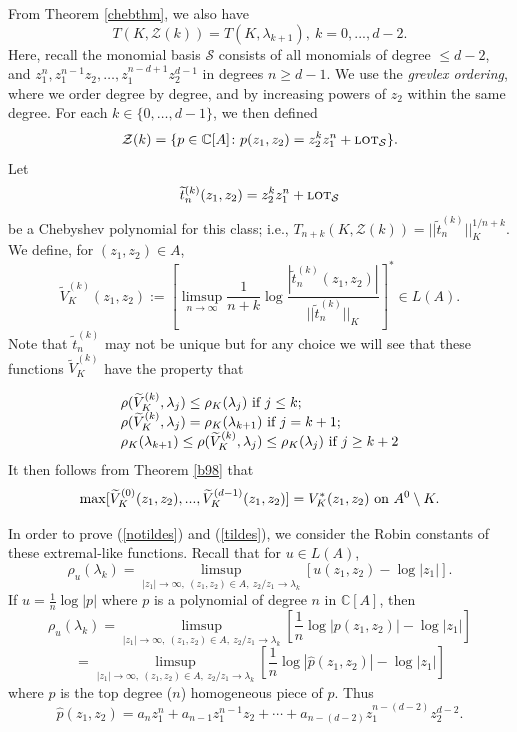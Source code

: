 \documentclass[12pt]{article}
\numberwithin{equation}{section}
\newcommand{\C}{\mathbb{C}}
\renewcommand{\hat}{\widehat}
\renewcommand{\tilde}{\widetilde}
\newcommand{\lot}{\text{\sc lot}}
\newcommand{\calZ}{\mathcal{Z}}
\newcommand{\calS}{\mathcal{S}}
\begin{document}
From Theorem \ref{chebthm}, we also have 
\begin{equation}\label{keyeq} T(K,\calZ(k))=T(K,\lambda_{k+1}), \ k=0,...,d-2. \end{equation} 
Here, recall the monomial basis $\calS$ consists of all monomials of degree $\leq d-2$, and $z_1^{n},  z_1^{n-1}z_2,\ldots,z_1^{n-d+1}z_2^{d-1}$ in degrees $n\geq d-1$.  We use the \emph{grevlex ordering}, where we order degree by degree,  and by increasing powers of $z_2$ within the same degree. For each $k\in\{0,\ldots,d-1\}$, we then defined 
$$\calZ(k) = \{ p\in\C[A]\colon p(z_1,z_2)=z_2^kz_1^n+\lot_{\calS} \}.$$
Let 
$$\tilde t_{n}^{(k)}(z_1,z_2)=z_2^kz_1^n+\lot_{\calS}$$
be a Chebyshev polynomial for this class; i.e., $T_{n+k}(K,\calZ(k))= ||\tilde t_{n}^{(k)}||_K^{1/n+k}$. We define, for $(z_1,z_2)\in A$,   
\begin{equation}\label{vkkt} \tilde V_{K}^{(k)}(z_1,z_2):=[\limsup_{n\to \infty} \frac{1}{n+k}\log \frac{| \tilde t_{n}^{(k)}(z_1,z_2)|}{||\tilde t_{n}^{(k)}||_K}]^* \in L(A).\end{equation}
Note that $\tilde t_{n}^{(k)}$ may not be unique 
but for any choice we will see that these functions $\tilde V_{K}^{(k)}$ have the property that 

\begin{eqnarray}\label{tildes}
\begin{array}{l} \rho(\tilde V_{K}^{(k)},\lambda_j) \leq \rho_K(\lambda_{j}) \ \hbox{if } j \leq k;\\
 \rho(\tilde V_{K}^{(k)},\lambda_j)=  \rho_K(\lambda_{k+1}) \ \hbox{if } j= k+1; \\
 \rho_K(\lambda_{k+1})  \leq   \rho(\tilde V_{K}^{(k)},\lambda_j) \leq \rho_K(\lambda_{j}) \ \hbox{if } j \geq k+2
     \end{array} 
\end{eqnarray}
It then follows from Theorem \ref{b98} that 
$$\max [\tilde V_{K}^{(0)}(z_1,z_2),...,\tilde V_{K}^{(d-1)}(z_1,z_2)]= V_K^*(z_1,z_2)  \ \hbox{on} \ A^0 \setminus K.$$

In order to prove (\ref{notildes}) and (\ref{tildes}), we consider the Robin constants of these extremal-like functions. Recall that for $u\in L(A)$, 
$$\rho_u(\lambda_k)=\limsup_{|z_1|\to \infty, \ (z_1,z_2)\in A, \ z_2/z_1\to \lambda_k} [u(z_1,z_2)-\log |z_1|].$$
If $u=\frac{1}{n}\log |p|$ where $p$ is a polynomial of degree $n$ in $\C[A]$, then
$$\rho_u(\lambda_k)=\limsup_{|z_1|\to \infty, \ (z_1,z_2)\in A, \ z_2/z_1\to \lambda_k} [\frac{1}{n}\log |p(z_1,z_2)|-\log |z_1|]$$
$$=\limsup_{|z_1|\to \infty, \ (z_1,z_2)\in A, \ z_2/z_1\to \lambda_k} [\frac{1}{n}\log |\hat p(z_1,z_2)|-\log |z_1|]$$
where $\hat p$ is the top degree ($n$) homogeneous piece of $p$. Thus 
$$\hat p(z_1,z_2)= a_nz_1^n +a_{n-1}z_1^{n-1}z_2 +\cdots + a_{n-(d-2)}z_1^{n-(d-2)}z_2^{d-2}.$$
\end{document}
